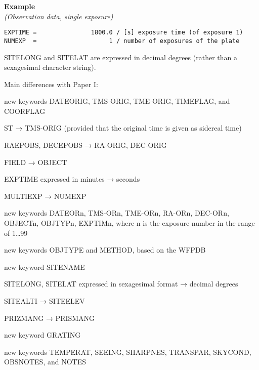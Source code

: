 \documentclass[11pt]{ivoa}
\newenvironment{fitsexample}[1]
{\bigskip\noindent\textbf{Example}\\\textit{(#1\smallskip)}}
{\medskip}
\begin{document}
\begin{fitsexample}{Observation data, single exposure}
\begin{lstlisting}
EXPTIME =               1800.0 / [s] exposure time (of exposure 1)
NUMEXP  =                    1 / number of exposures of the plate
\end{lstlisting}
\end{fitsexample}

SITELONG and SITELAT are expressed in decimal degrees (rather than a
sexagesimal character string).

Main differences with Paper I:

new keywords DATEORIG, TMS-ORIG, TME-ORIG, TIMEFLAG, and COORFLAG

ST → TMS-ORIG (provided that the original time is given as sidereal time)

RAEPOBS, DECEPOBS → RA-ORIG, DEC-ORIG

FIELD → OBJECT

EXPTIME expressed in minutes → seconds

MULTIEXP → NUMEXP

new keywords DATEORn, TMS-ORn, TME-ORn, RA-ORn, DEC-ORn, OBJECTn, OBJTYPn, EXPTIMn, where n is the exposure number in the range of 1…99

new keywords OBJTYPE and METHOD, based on the WFPDB

new keyword SITENAME

SITELONG, SITELAT expressed in sexagesimal format → decimal degrees

SITEALTI → SITEELEV

PRIZMANG → PRISMANG

new keyword GRATING

new keywords TEMPERAT, SEEING, SHARPNES, TRANSPAR, SKYCOND, OBSNOTES, and NOTES
\end{document}
